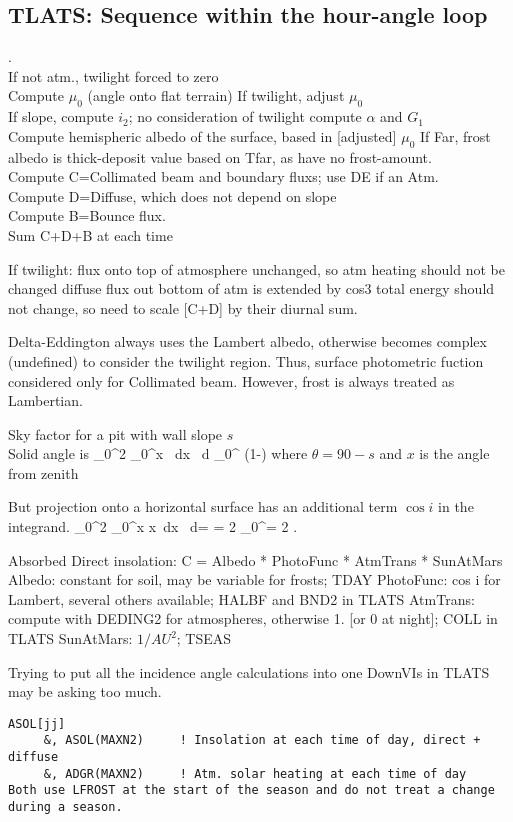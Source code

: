 \subsection{TLATS: Sequence within the hour-angle loop }
.
\\ If not atm., twilight forced to zero
\\ Compute $\mu_0$ (angle onto flat terrain)
\qi If twilight, adjust $\mu_0$
\\ If slope, compute $i_2$; no consideration of twilight
\qi compute $\alpha$ and $G_1$
\\ Compute hemispheric albedo of the surface, based in [adjusted]  $\mu_0$
\qi If Far, frost albedo is thick-deposit value based on Tfar, as have no frost-amount.
\\ Compute C=Collimated beam and boundary fluxs; use DE if an Atm.
\\ Compute D=Diffuse, which does not depend on slope
\\ Compute B=Bounce flux.
\\ Sum C+D+B at each time

If twilight:
\qi flux onto top of atmosphere unchanged, so atm heating should not be changed
\qi diffuse flux out bottom of atm is extended by cos3
\qi total energy should not change, so need to scale [C+D] by their diurnal sum.


Delta-Eddington always uses the Lambert albedo, otherwise becomes complex
(undefined) to consider the twilight region. Thus, surface photometric fuction
considered only for Collimated beam. However, frost is always treated as
Lambertian.


 Sky factor for a pit with wall slope $s$
\\ Solid angle is 
\qb \int_0^{2\pi} \int_0^\theta \sin x \  dx \ d \pi {}_0^ \pi (1-\cos \theta) \qe where $\theta = 90 -s$ and $x$ is the angle from zenith

But projection onto a horizontal surface has an additional term $\cos i $ in the integrand.  
\qb \int_0^{2\pi} \int_0^\theta \sin x \cos x\  dx \ d\phi =  = 2 \pi {}_0^\theta = 2 \pi {} \qe
.  

Absorbed Direct insolation: C = Albedo * PhotoFunc * AtmTrans * SunAtMars 
\qi Albedo: constant for soil, may be variable for frosts;   TDAY
\qi PhotoFunc: cos i for Lambert, several others available;  HALBF and BND2 in TLATS
\qi AtmTrans: compute with DEDING2 for atmospheres, otherwise 1. [or 0 at night]; COLL in TLATS
\qi SunAtMars: $1/AU^2$; TSEAS 


Trying to put all the incidence angle calculations into one DownVIs in TLATS may be asking too much.
\vspace{-3.mm} 
\begin{verbatim} 
ASOL[jj]                    
     &, ASOL(MAXN2)     ! Insolation at each time of day, direct + diffuse
     &, ADGR(MAXN2)     ! Atm. solar heating at each time of day 
Both use LFROST at the start of the season and do not treat a change during a season.
\end{verbatim} 


